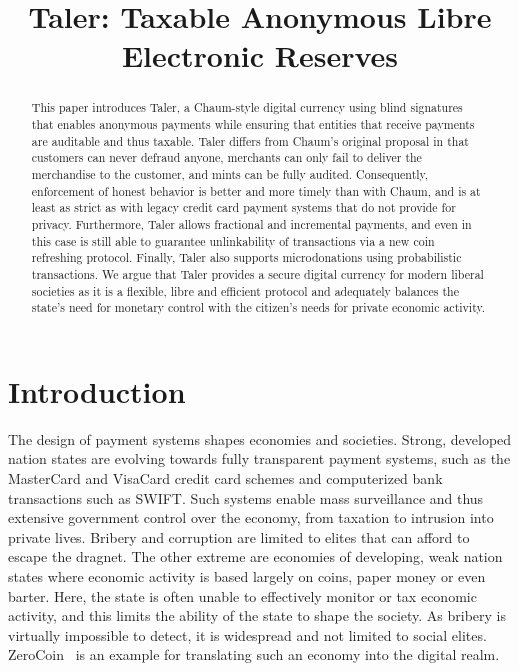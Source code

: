 \documentclass{llncs}
\title{Taler: Taxable Anonymous Libre Electronic Reserves}
\begin{document}
\mainmatter



\maketitle

\begin{abstract}
This paper introduces Taler, a Chaum-style digital currency using
blind signatures that enables anonymous payments while ensuring that
entities that receive payments are auditable and thus taxable.  Taler
differs from Chaum's original proposal in that customers can never defraud anyone,
merchants can only fail to deliver the merchandise to the customer,
and mints can be fully audited. Consequently, enforcement of honest
behavior is better and more timely than with Chaum, and is at least as
strict as with legacy credit card payment systems that do not provide
for privacy.  Furthermore, Taler allows fractional and incremental
payments, and even in this case is still able to guarantee
unlinkability of transactions via a new coin refreshing protocol.
Finally, Taler also supports microdonations using probabilistic
transactions.  We argue that Taler provides a secure digital currency
for modern liberal societies as it is a flexible, libre and efficient
protocol and adequately balances the state's need for monetary control
with the citizen's needs for private economic activity.
\end{abstract}

\section{Introduction}

The design of payment systems shapes economies and societies.  Strong,
developed nation states are evolving towards fully transparent payment
systems, such as the MasterCard and VisaCard credit card schemes and
computerized bank transactions such as SWIFT.  Such systems enable
mass surveillance and thus extensive government control over the
economy, from taxation to intrusion into private lives.  Bribery and
corruption are limited to elites that can afford to escape the
dragnet.  The other extreme are economies of developing, weak nation
states where economic activity is based largely on coins, paper money
or even barter.  Here, the state is often unable to effectively
monitor or tax economic activity, and this limits the ability of the
state to shape the society.  As bribery is virtually impossible to
detect, it is widespread and not limited to social elites.
ZeroCoin~\cite{miers2013zerocoin} is an example for translating such
an economy into the digital realm.
\end{document}
